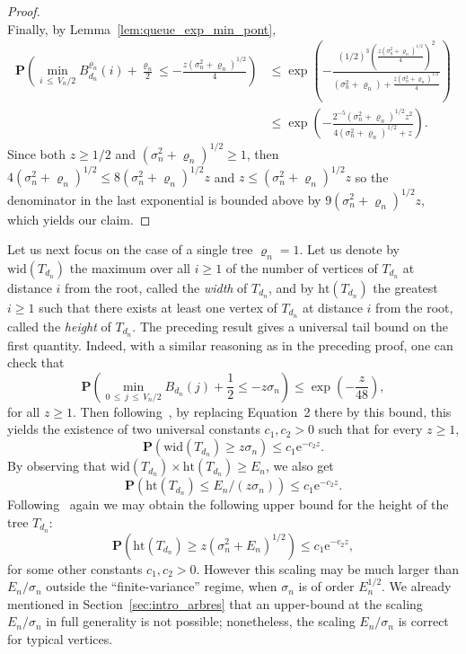 \documentclass[10pt]{amsart}
\theoremstyle{definition}\newtheorem{defi}[theo]{Definition}\newtheorem{rema}[theo]{Remark}\newtheorem{exam}[theo]{Example}\newtheorem{exem}[theo]{Example}\newtheorem{nota}[theo]{Notation}
\newcommand{\ensembles}[1]{\mathbf{#1}}
\renewcommand{\P}{\ensembles{P}}
\renewcommand{\Pr}[1]{\P\left(#1\right)}
\newcommand{\1}{\ensembles{1}}
\renewcommand{\le}{\leqslant}
\renewcommand{\ge}{\geqslant}
\newcommand{\e}{\mathrm{e}}
\newcommand{\wid}{\mathrm{wid}}
\newcommand{\h}{\mathrm{ht}}
\newcommand{\tn}{T_{d_n}}
\newcommand{\Bfn}{B_{d_n}^{\varrho_n}}
\newcommand{\Btn}{B_{d_n}}
\newcommand{\edges}{E}
\newcommand{\vertices}{V}
\providecommand{\?}{}
\begin{document}
\begin{proof}
\[\]
Finally, by Lemma~\ref{lem:queue_exp_min_pont},
\begin{align*}
\Pr{\min_{i\,\le\,\vertices_n/2} \Bfn(i) + \frac{\varrho_n}{2} \le - \frac{z \left(\sigma_n^2+\varrho_n\right)^{1/2}}{4}} &\le \exp\left(- \frac{(1/2)^3 \left(\frac{z \left(\sigma_n^2+\varrho_n\right)^{1/2}}{4}\right)^2}{\left(\sigma_n^2+\varrho_n\right) + \frac{z\left(\sigma_n^2+\varrho_n\right)^{1/2}}{4}}\right)
\\
&\le \exp\left(- \frac{2^{-5}\left(\sigma_n^2+\varrho_n\right)^{1/2} z^2}{4\left(\sigma_n^2+\varrho_n\right)^{1/2} + z}\right).
\end{align*}
Since both $z \ge 1/2$ and $(\sigma_n^2+\varrho_n)^{1/2} \ge 1$, then $4(\sigma_n^2+\varrho_n)^{1/2} \le 8 (\sigma_n^2+\varrho_n)^{1/2} z$ and $z \le (\sigma_n^2+\varrho_n)^{1/2} z$ so the denominator in the last exponential is bounded above by $9 (\sigma_n^2+\varrho_n)^{1/2} z$, which yields our claim.
\end{proof}



Let us next focus on the case of a single tree $\varrho_n = 1$. Let us denote by $\wid(\tn)$ the maximum over all $i \ge 1$ of the number of vertices of $\tn$ at distance $i$ from the root, called the \emph{width} of $\tn$, and by $\h(\tn)$ the greatest $i \ge 1$ such that there exists at least one vertex of $\tn$ at distance $i$ from the root, called the \emph{height} of $\tn$. The preceding result gives a universal tail bound on the first quantity. Indeed, with a similar reasoning as in the preceding proof, one can check that
\begin{equation}\label{eq:queue_min_pont}
\Pr{\min_{0\,\le\,j\,\le\,\vertices_n/2} \Btn(j) + \frac{1}{2} \le - z \sigma_n}
\le \exp\left(- \frac{z}{48}\right),
\end{equation}
for all $z \ge 1$. Then following~\cite{AB12}, by replacing Equation~2 there by this bound, this yields the existence of two universal constants $c_1, c_2 > 0$ such that for every $z \ge 1$,
\[
\Pr{\wid(\tn) \ge z \sigma_n} \le c_1 \e^{- c_2 z}.
\]
By observing that $\wid(\tn) \times \h(\tn) \ge \edges_n$, we also get
\[
\Pr{\h(\tn) \le \edges_n / (z \sigma_n)} \le c_1 \e^{-c_2 z}.
\]
Following~\cite{AB12} again we may obtain the following upper bound for the height of the tree $\tn$:
\begin{equation}\label{eq:queue_exp_hauteur}
\Pr{\h\left(\tn\right) \ge z \left(\sigma_n^2+\edges_n\right)^{1/2}} \le c_1 \e^{-c_2 z},
\end{equation}
for some other constants $c_1, c_2 > 0$. However this scaling may be much larger than $\edges_n / \sigma_n$ outside the ``finite-variance'' regime, when $\sigma_n$ is of order $\edges_n^{1/2}$. We already mentioned in Section~\ref{sec:intro_arbres} that an upper-bound at the scaling $\edges_n / \sigma_n$ in full generality is not possible; nonetheless, the scaling $\edges_n / \sigma_n$ is correct for typical vertices.
\end{document}
